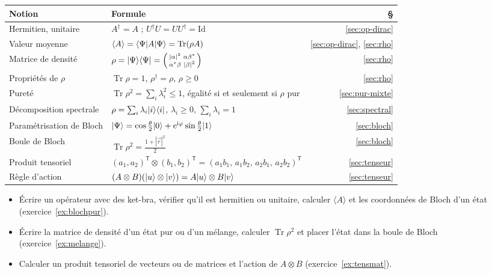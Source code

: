 \begin{center}
\renewcommand{\arraystretch}{1.45}
\begin{tabular}{@{}l l r@{}}
\toprule
\textbf{Notion} & \textbf{Formule} & \textbf{§} \\
\midrule
Hermitien, unitaire & $A^\dagger=A$ ; \quad $U^\dagger U=UU^\dagger=\mathrm{Id}$ & \ref{sec:op-dirac} \\
Valeur moyenne & $\langle A\rangle=\langle \Psi|A|\Psi\rangle=\operatorname{Tr}(\rho A)$
  & \ref{sec:op-dirac}, \ref{sec:rho} \\
Matrice de densité & $\rho=|\Psi\rangle\langle \Psi|=\left(\begin{smallmatrix}|\alpha|^2 & \alpha\beta^*\\ \alpha^*\beta & |\beta|^2\end{smallmatrix}\right)$
  & \ref{sec:rho} \\
Propriétés de $\rho$ & $\operatorname{Tr}\rho=1$, \quad $\rho^\dagger=\rho$, \quad $\rho\geq0$ & \ref{sec:rho} \\
Pureté & $\operatorname{Tr}\rho^2=\sum_i\lambda_i^2\leq1$, égalité si et seulement si $\rho$ pur
  & \ref{sec:pur-mixte} \\
Décomposition spectrale & $\rho=\sum_i\lambda_i|i\rangle\langle i|$, \quad $\lambda_i\geq0$, \quad $\sum_i\lambda_i=1$
  & \ref{sec:spectral} \\
Paramétrisation de Bloch & $|\Psi\rangle=\cos\frac\theta2|0\rangle+\mathrm{e}^{\mathrm{i}\varphi}\sin\frac\theta2|1\rangle$
  & \ref{sec:bloch} \\
Boule de Bloch & $\operatorname{Tr}\rho^2=\frac{1+|\vec r|^2}{2}$ & \ref{sec:bloch} \\
Produit tensoriel & $(a_1,a_2)^{\mathsf T}\otimes(b_1,b_2)^{\mathsf T}
  =(a_1b_1,\,a_1b_2,\,a_2b_1,\,a_2b_2)^{\mathsf T}$ & \ref{sec:tenseur} \\
Règle d'action & $(A\otimes B)(|u\rangle\otimes|v\rangle)=A|u\rangle\otimes B|v\rangle$ & \ref{sec:tenseur} \\
\bottomrule
\end{tabular}
\end{center}

\begin{savoirfaire}
\begin{itemize}
  \item Écrire un opérateur avec des ket-bra, vérifier qu'il est hermitien ou unitaire, calculer
        $\langle A\rangle$ et les coordonnées de Bloch d'un état (exercice~\ref{ex:blochpur}).
  \item Écrire la matrice de densité d'un état pur ou d'un mélange, calculer $\operatorname{Tr}\rho^2$
        et placer l'état dans la boule de Bloch (exercice~\ref{ex:melange}).
  \item Calculer un produit tensoriel de vecteurs ou de matrices et l'action de $A\otimes B$
        (exercice~\ref{ex:tensmat}).
\end{itemize}
\end{savoirfaire}
